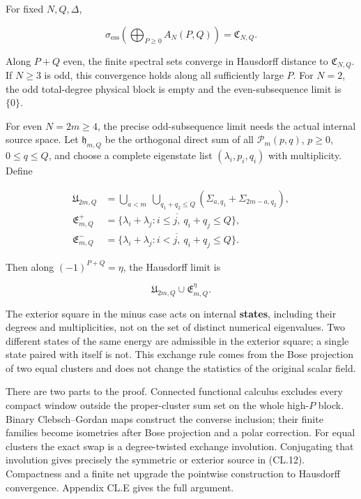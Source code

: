 For fixed \(N,Q,\Delta\),

\[
\sigma_{\mathrm{ess}}\!\left(\bigoplus_{P\geq0}A_N(P,Q)\right)
=\mathfrak C_{N,Q}.
\tag{CL.11}
\]

Along \(P+Q\) even, the finite spectral sets converge in Hausdorff distance to \(\mathfrak C_{N,Q}\). If \(N\geq3\) is odd, this convergence holds along all sufficiently large \(P\). For \(N=2\), the odd total-degree physical block is empty and the even-subsequence limit is \(\{0\}\).

For even \(N=2m\geq4\), the precise odd-subsequence limit needs the actual internal source space. Let \(\mathfrak h_{m,Q}\) be the orthogonal direct sum of all \(\mathcal P_m(p,q)\), \(p\geq0\), \(0\leq q\leq Q\), and choose a complete eigenstate list \((\lambda_i,p_i,q_i)\) with multiplicity. Define

\[
\begin{aligned}
\mathfrak U_{2m,Q}
 &=\bigcup_{a<m}\ \bigcup_{q_1+q_2\leq Q}
 (\Sigma_{a,q_1}+\Sigma_{2m-a,q_2}),\\
\mathfrak E_{m,Q}^{+}
 &=\overline{\{\lambda_i+\lambda_j:i\leq j,\ q_i+q_j\leq Q\}},\\
\mathfrak E_{m,Q}^{-}
 &=\overline{\{\lambda_i+\lambda_j:i<j,\ q_i+q_j\leq Q\}}.
\end{aligned}
\tag{CL.12}
\]

Then along \((-1)^{P+Q}=\eta\), the Hausdorff limit is

\[
\mathfrak U_{2m,Q}\cup\mathfrak E_{m,Q}^{\eta}.
\tag{CL.13}
\]

The exterior square in the minus case acts on internal \textbf{states}, including their degrees and multiplicities, not on the set of distinct numerical eigenvalues. Two different states of the same energy are admissible in the exterior square; a single state paired with itself is not. This exchange rule comes from the Bose projection of two equal clusters and does not change the statistics of the original scalar field.

There are two parts to the proof. Connected functional calculus excludes every compact window outside the proper-cluster sum set on the whole high-\(P\) block. Binary Clebsch--Gordan maps construct the converse inclusion; their finite families become isometries after Bose projection and a polar correction. For equal clusters the exact swap is a degree-twisted exchange involution. Conjugating that involution gives precisely the symmetric or exterior source in (CL.12). Compactness and a finite net upgrade the pointwise construction to Hausdorff convergence. Appendix CL.E gives the full argument.


